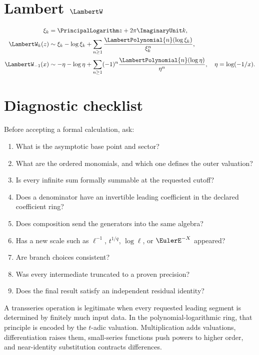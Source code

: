 \documentclass[11pt,oneside,openany]{book}
\begin{document}
\section{Lambert \texorpdfstring{\(\LambertW\)}{W}}
\begin{align}
 \xi_k&=\PrincipalLogarithm z+2\pi\ImaginaryUnit k,
 \label{eq:sheetxi}\\
 \LambertW_k(z)&\sim\xi_k-\log\xi_k+
 \sum_{n\geq1}\frac{\LambertPolynomial{n}(\log\xi_k)}{\xi_k^n},
 \label{eq:sheetW}\\
 \LambertW_{-1}(x)&\sim-\eta-\log\eta+
 \sum_{n\geq1}(-1)^n
 \frac{\LambertPolynomial{n}(\log\eta)}{\eta^n},
 \quad \eta=\log(-1/x).
 \label{eq:sheetWminus}
\end{align}

\section{Diagnostic checklist}
Before accepting a formal calculation, ask:

\begin{enumerate}
\item What is the asymptotic base point and sector?
\item What are the ordered monomials, and which one defines the outer
valuation?
\item Is every infinite sum formally summable at the requested cutoff?
\item Does a denominator have an invertible leading coefficient in the declared
coefficient ring?
\item Does composition send the generators into the same algebra?
\item Has a new scale such as \(\ell^{-1}\), \(t^{1/q}\), \(\log\ell\), or
\(\EulerE^{-X}\) appeared?
\item Are branch choices consistent?
\item Was every intermediate truncated to a proven precision?
\item Does the final result satisfy an independent residual identity?
\end{enumerate}

\begin{summarybox}
A transseries operation is legitimate when every requested leading segment is
determined by finitely much input data.  In the polynomial-logarithmic ring,
that principle is encoded by the \(t\)-adic valuation.  Multiplication adds
valuations, differentiation raises them, small-series functions push powers to
higher order, and near-identity substitution contracts differences.
\end{summarybox}
\end{document}
